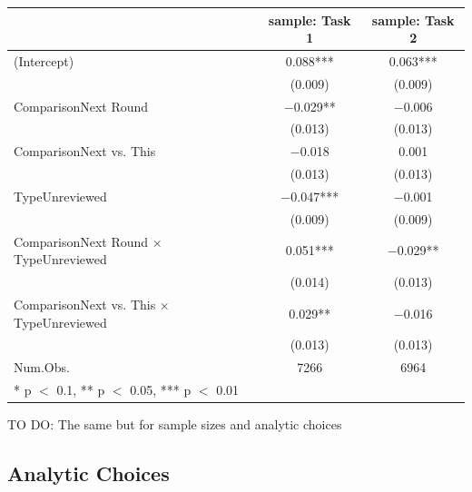 \documentclass[
  letterpaper,
  DIV=11,
  numbers=noendperiod]{scrartcl}
\begin{document}
\begin{table}
\centering
\begin{tabular}[t]{lcc}
\toprule
  & sample: Task 1 & sample: Task 2\\
\midrule
(Intercept) & \num{0.088}*** & \num{0.063}***\\
 & (\num{0.009}) & \vphantom{1} (\num{0.009})\\
ComparisonNext Round & \num{-0.029}** & \num{-0.006}\\
 & (\num{0.013}) & \vphantom{2} (\num{0.013})\\
ComparisonNext vs. This & \num{-0.018} & \num{0.001}\\
 & (\num{0.013}) & \vphantom{1} (\num{0.013})\\
TypeUnreviewed & \num{-0.047}*** & \num{-0.001}\\
 & (\num{0.009}) & (\num{0.009})\\
ComparisonNext Round × TypeUnreviewed & \num{0.051}*** & \num{-0.029}**\\
 & (\num{0.014}) & (\num{0.013})\\
ComparisonNext vs. This × TypeUnreviewed & \num{0.029}** & \num{-0.016}\\
 & (\num{0.013}) & (\num{0.013})\\
\midrule
Num.Obs. & \num{7266} & \num{6964}\\
\bottomrule
\multicolumn{3}{l}{\rule{0pt}{1em}* p $<$ 0.1, ** p $<$ 0.05, *** p $<$ 0.01}\\
\end{tabular}
\end{table}

TO DO: The same but for sample sizes and analytic choices

\hypertarget{analytic-choices}{%
\subsection{Analytic Choices}\label{analytic-choices}}
\end{document}
